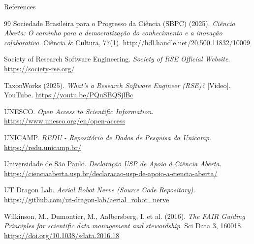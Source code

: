 \documentclass[aspectratio=169]{beamer}
\begin{document}
\begin{frame}[allowframebreaks]{References}
\begin{thebibliography}{99}
    Sociedade Brasileira para o Progresso da Ciência (SBPC) (2025).
    \newblock \textit{Ciência Aberta: O caminho para a democratização do conhecimento e a inovação colaborativa}.
    \newblock Ciência \& Cultura, 77(1). \url{http://hdl.handle.net/20.500.11832/10009}
    
    Society of Research Software Engineering.
    \newblock \textit{Society of RSE Official Website}.
    \newblock \url{https://society-rse.org/}

    TaxonWorks (2025).
    \newblock \textit{What's a Research Software Engineer (RSE)?} [Video]. YouTube.
    \newblock \url{https://youtu.be/PQuSBQSjlBc}

    UNESCO.
    \newblock \textit{Open Access to Scientific Information}.
    \newblock \url{https://www.unesco.org/en/open-access}

    UNICAMP.
    \newblock \textit{REDU - Repositório de Dados de Pesquisa da Unicamp}.
    \newblock \url{https://redu.unicamp.br/}

    Universidade de São Paulo.
    \newblock \textit{Declaração USP de Apoio à Ciência Aberta}.
    \newblock \url{https://cienciaaberta.usp.br/declaracao-usp-de-apoio-a-ciencia-aberta/}

    UT Dragon Lab. \textit{Aerial Robot Nerve (Source Code Repository)}.
    \newblock \url{https://github.com/ut-dragon-lab/aerial_robot_nerve}

    Wilkinson, M., Dumontier, M., Aalbersberg, I. et al. (2016).
    \newblock \textit{The FAIR Guiding Principles for scientific data management and stewardship}.
    \newblock Sci Data 3, 160018. \url{https://doi.org/10.1038/sdata.2016.18}
  \end{thebibliography}
\end{frame}
\end{document}
